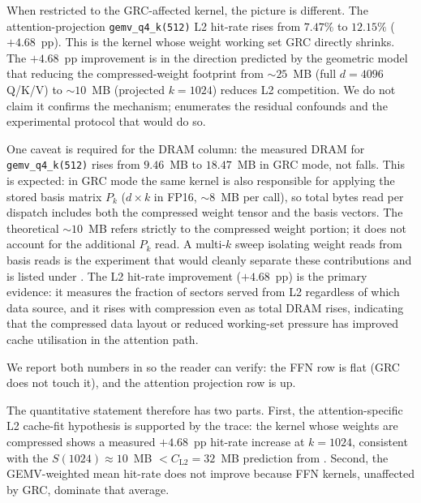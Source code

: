 \documentclass[11pt]{article}
\begin{document}
When restricted to the GRC-affected kernel, the picture is different. The
attention-projection \texttt{gemv\_q4\_k(512)} L2 hit-rate rises from $7.47\%$
to $12.15\%$ ($+4.68$~pp). This is the kernel whose weight working set GRC
directly shrinks. The $+4.68$~pp improvement is in the direction predicted
by the geometric model that reducing the compressed-weight footprint from
${\sim}25$~MB (full $d{=}4096$ Q/K/V) to ${\sim}10$~MB (projected
$k{=}1024$) reduces L2 competition. We do not claim it confirms the
mechanism;  enumerates the residual confounds
and the experimental protocol that would do so.

One caveat is required for the DRAM column: the measured DRAM for
\texttt{gemv\_q4\_k(512)} rises from $9.46$~MB to $18.47$~MB in GRC mode,
not falls. This is expected: in GRC mode the same kernel is also responsible
for applying the stored basis matrix $P_k$ ($d{\times}k$ in FP16, ${\sim}8$~MB
per call), so total bytes read per dispatch includes both the compressed
weight tensor and the basis vectors. The theoretical ${\sim}10$~MB refers
strictly to the compressed weight portion; it does not account for the
additional $P_k$ read. A multi-$k$ sweep isolating weight reads from basis
reads is the experiment that would cleanly separate these contributions and
is listed under . The L2 hit-rate improvement ($+4.68$~pp)
is the primary evidence: it measures the fraction of sectors served from L2
regardless of which data source, and it rises with compression even as total
DRAM rises, indicating that the compressed data layout or reduced working-set
pressure has improved cache utilisation in the attention path.

We report both numbers in  so the
reader can verify: the FFN row is flat (GRC does not touch it), and the
attention projection row is up.

The quantitative statement therefore has two parts. First, the
attention-specific L2 cache-fit hypothesis is supported by the trace:
the kernel whose weights are compressed shows a measured $+4.68$~pp
hit-rate increase at $k{=}1024$, consistent with the $S(1024)\approx 10$~MB
$< C_\text{L2} = 32$~MB prediction from . Second, the
GEMV-weighted mean hit-rate does not improve because FFN kernels, unaffected
by GRC, dominate that average.
\end{document}
